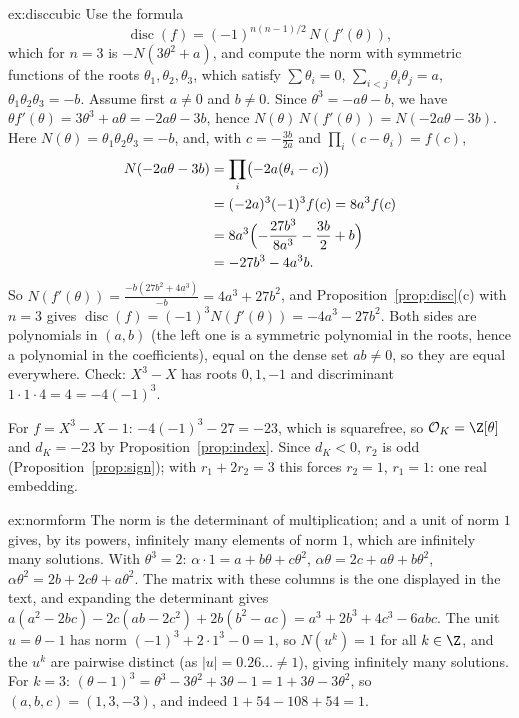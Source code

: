 \begin{solution}{ex:disccubic}
\idea Use the formula
\[
\operatorname{disc}(f)=(-1)^{n(n-1)/2}\,N(f'(\theta)),
\]
which for $n=3$ is $-N(3\theta^2+a)$, and compute the
norm with symmetric functions of the roots $\theta_1,\theta_2,\theta_3$, which satisfy $\sum\theta_i=0$,
$\sum_{i<j}\theta_i\theta_j=a$, $\theta_1\theta_2\theta_3=-b$.
\writeup Assume first $a\ne0$ and $b\ne0$. Since $\theta^3=-a\theta-b$, we have $\theta f'(\theta)=3\theta^3+a\theta=
-2a\theta-3b$, hence $N(\theta)\,N(f'(\theta))=N(-2a\theta-3b)$. Here $N(\theta)=\theta_1\theta_2\theta_3=-b$, and, with
$c=-\frac{3b}{2a}$ and $\prod_i(c-\theta_i)=f(c)$,
\begin{align*}
N(-2a\theta-3b)&=\prod_i\bigl(-2a(\theta_i-c)\bigr)\\&=(-2a)^3(-1)^3f(c)=8a^3f(c)\\
&=8a^3\Bigl(-\frac{27b^3}{8a^3}-\frac{3b}2+b\Bigr)\\&=-27b^3-4a^3b.
\end{align*}
So $N(f'(\theta))=\frac{-b(27b^2+4a^3)}{-b}=4a^3+27b^2$, and Proposition~\ref{prop:disc}(c) with $n=3$ gives
$\operatorname{disc}(f)=(-1)^3N(f'(\theta))=-4a^3-27b^2$. Both sides are polynomials in $(a,b)$ (the left one is a
symmetric polynomial in the roots, hence a polynomial in the coefficients), equal on the dense set $ab\ne0$, so they are
equal everywhere. Check: $X^3-X$ has roots $0,1,-1$ and discriminant $1\cdot1\cdot4=4=-4(-1)^3$.

For $f=X^3-X-1$: $-4(-1)^3-27=-23$, which is squarefree, so $\mathcal O_K=\Z[\theta]$ and $d_K=-23$ by
Proposition~\ref{prop:index}. Since $d_K<0$, $r_2$ is odd (Proposition~\ref{prop:sign}); with $r_1+2r_2=3$ this
forces $r_2=1$, $r_1=1$: one real embedding.
\end{solution}

\begin{solution}{ex:normform}
\idea The norm is the determinant of multiplication; and a unit of norm $1$ gives, by its powers, infinitely many
elements of norm $1$, which are infinitely many solutions.
\writeup With $\theta^3=2$: $\alpha\cdot1=a+b\theta+c\theta^2$, $\alpha\theta=2c+a\theta+b\theta^2$,
$\alpha\theta^2=2b+2c\theta+a\theta^2$. The matrix with these columns is the one displayed in the text, and expanding
the determinant gives $a(a^2-2bc)-2c(ab-2c^2)+2b(b^2-ac)=a^3+2b^3+4c^3-6abc$. The unit $u=\theta-1$ has norm
$(-1)^3+2\cdot1^3-0=1$, so $N(u^k)=1$ for all $k\in\Z$, and the $u^k$ are pairwise distinct (as $|u|=0.26\ldots\ne1$),
giving infinitely many solutions. For $k=3$: $(\theta-1)^3=\theta^3-3\theta^2+3\theta-1=1+3\theta-3\theta^2$, so
$(a,b,c)=(1,3,-3)$, and indeed $1+54-108+54=1$.
\end{solution}

